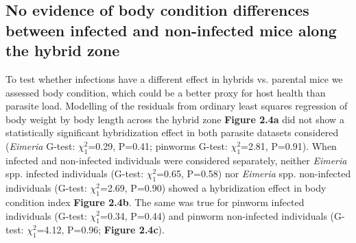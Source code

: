 \subsection{No evidence of body condition differences between infected and non-infected mice along the hybrid zone}
To test whether infections have a different effect in hybrids vs. parental mice we assessed body condition, which could be a better proxy for host health than parasite load. Modelling of the residuals from ordinary least squares regression of body weight by body length across the hybrid zone \textbf{Figure 2.4a} did not show a statistically significant hybridization effect in both parasite datasets considered (\textit{Eimeria} G-test: $\chi_{1}^{2}$=0.29, P=0.41; pinworms G-test: $\chi_{1}^{2}$=2.81, P=0.91). When infected and non-infected individuals were considered separately, neither \textit{Eimeria} spp. infected individuals (G-test: $\chi_{1}^{2}$=0.65, P=0.58) nor \textit{Eimeria} spp. non-infected individuals (G-test: $\chi_{1}^{2}$=2.69, P=0.90) showed a hybridization effect in body condition index \textbf{Figure 2.4b}. The same was true for pinworm infected individuals (G-test: $\chi_{1}^{2}$=0.34, P=0.44) and pinworm non-infected individuals (G-test: $\chi_{1}^{2}$=4.12, P=0.96; \textbf{Figure 2.4c}). 


